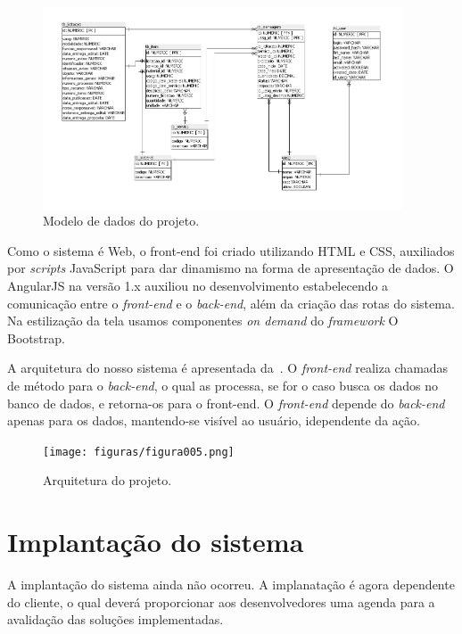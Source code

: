 \begin{figure}
	\includegraphics[width=0.95\textwidth]{figuras/bdAtualizado.png}
	\caption{Modelo de dados do projeto.}
	\label{Figura007}
\end{figure}

Como o sistema é Web, o front-end foi criado utilizando  HTML e CSS, auxiliados por \textit{scripts} JavaScript para dar dinamismo na forma de apresentação de dados.
O AngularJS na versão 1.x auxiliou no desenvolvimento estabelecendo a comunicação entre o \textit{front-end} e o \textit{back-end}, além da criação das rotas do sistema.
Na estilização da tela usamos componentes \textit{on demand} do \textit{framework} O Bootstrap.

A arquitetura do nosso sistema é apresentada da~.
O \textit{front-end} realiza chamadas de método para o \textit{back-end}, o qual as processa, se for o caso busca os dados no banco de dados, e retorna-os para o front-end.
O \textit{front-end} depende do \textit{back-end} apenas para os dados, mantendo-se visível ao usuário, idependente da ação.

\begin{figure}
    \centering
    \texttt{[image: figuras/figura005.png]}
    \caption{Arquitetura do projeto.}
    \label{Figura005}
\end{figure}

\section{Implantação do sistema}

A implantação do sistema ainda não ocorreu.
A implanatação é agora dependente do cliente, o qual deverá proporcionar aos desenvolvedores uma agenda para a avalidação das soluções implementadas.